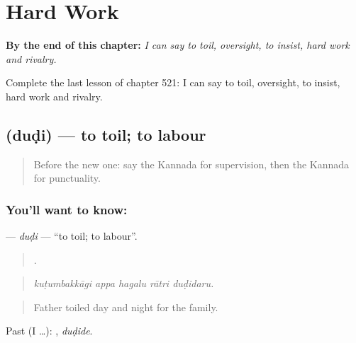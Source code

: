
\chapter{Hard Work}
\label{ch:ka-hard-work}

\begin{chapteropening}
\textbf{By the end of this chapter:} \emph{I can say to toil, oversight, to insist, hard work and rivalry.}

Complete the last lesson of chapter 521: I can say to toil, oversight, to insist, hard work and rivalry.
\end{chapteropening}

\section[\texorpdfstring{\kn{ದುಡಿ} (duḍi)}{ದುಡಿ (duḍi)}]{ (duḍi) — to toil; to labour}

\label{lesson:KA-C521-dudi}



\begin{quote}
Before the new one: say the Kannada for supervision, then the Kannada for punctuality.
\end{quote}

\subsection*{You'll want to know: }
\textbf{} — \emph{duḍi} — \textquotedblleft{}to toil; to labour\textquotedblright{}.

\begin{quote}
    .
\end{quote}

\begin{quote}
\emph{kuṭumbakkāgi appa hagalu rātri duḍidaru.}
\end{quote}

\begin{quote}
Father toiled day and night for the family.
\end{quote}

Past (I …): , \emph{duḍide}.

